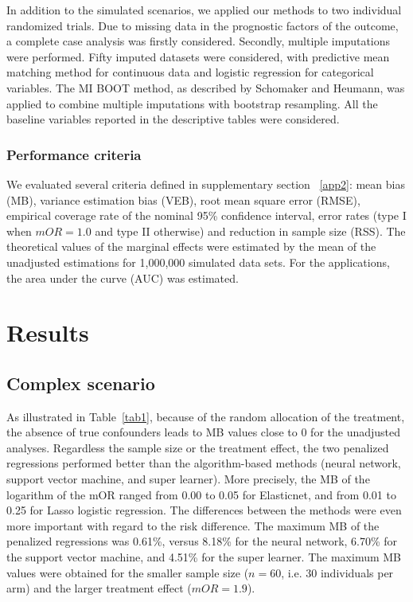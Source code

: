 \documentclass{article}
\begin{document}
In addition to the simulated scenarios, we applied our methods to two individual randomized trials. Due to missing data in the prognostic factors of the outcome, a complete case analysis was firstly considered. Secondly, multiple imputations were performed. Fifty imputed datasets were considered, with predictive mean matching method for continuous data and logistic regression for categorical variables. The MI BOOT method, as described by Schomaker and Heumann,\cite{schomaker_bootstrap_2018} was applied to combine multiple imputations with bootstrap resampling. All the baseline variables reported in the descriptive tables were considered.


\subsubsection{Performance criteria}

We evaluated several criteria defined in supplementary section ~\ref{app2}: mean bias (MB),  variance estimation bias (VEB),  root mean square error (RMSE),   empirical coverage rate of the nominal 95\% confidence interval,  error rates (type I when $mOR=1.0$ and type II otherwise) and reduction in sample  size (RSS).\cite{morris_using_2019}   The theoretical values of the marginal effects were estimated by the mean of the unadjusted estimations for 1,000,000 simulated data sets. For the applications, the area under the curve (AUC) was estimated. \\


\section{Results}


\subsection{Complex scenario}




As illustrated in Table~\ref{tab1},  because of the random allocation of the treatment, the absence of true confounders leads to MB values close to 0 for the unadjusted analyses.  Regardless the sample size or the treatment effect, the two penalized regressions performed better than the algorithm-based methods  (neural network, support vector machine,  and super learner).  More precisely,  the MB of the logarithm of the mOR ranged from 0.00 to 0.05 for Elasticnet,  and from 0.01 to 0.25 for Lasso logistic regression. The differences between the methods were even more important with regard to the risk difference.  The maximum MB of the penalized regressions was 0.61\%,  versus 8.18\% for the neural network,  6.70\% for the support vector machine,  and 4.51\% for the super learner.  The maximum MB values were obtained for the smaller sample size ($n=60$,  i.e. 30 individuals per arm) and the larger treatment effect ($mOR=1.9$). 
\end{document}
